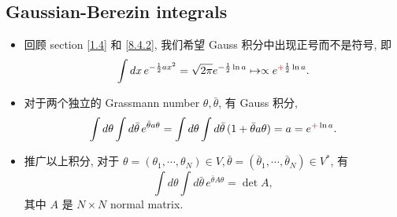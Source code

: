 \subsection{Gaussian-Berezin integrals}
\begin{itemize}
	\item 回顾 section \ref{1.4} 和 \eqref{8.4.2}, 我们希望 Gauss 积分中出现正号而不是符号, 即
	\begin{equation}
		\int dx \, e^{- \frac{1}{2} a x^2} = \sqrt{2 \pi} e^{- \frac{1}{2} \ln a} \mapsto \propto e^{\mathcolor{red}{+} \frac{1}{2} \ln a}.
	\end{equation}
	
	\item 对于两个独立的 Grassmann number $\theta, \bar{\theta}$, 有 Gauss 积分,
	\begin{equation}
		\int d\theta \int d\bar{\theta} \, e^{\bar{\theta} a \theta} = \int d\theta \int d\bar{\theta} \, (1 + \bar{\theta} a \theta) = a = e^{\mathcolor{red}{+} \ln a}.
	\end{equation}
	
	\item 推广以上积分, 对于 $\theta = (\theta_1, \cdots, \theta_N) \in V, \bar{\theta} = (\bar{\theta}_1, \cdots, \bar{\theta}_N) \in V^*$, 有
	\begin{equation}
		\int d\theta \int d\bar{\theta} \, e^{\bar{\theta} A \theta} = \det A,
	\end{equation}
	其中 $A$ 是 $N \times N$ normal matrix.
	

\end{itemize}
